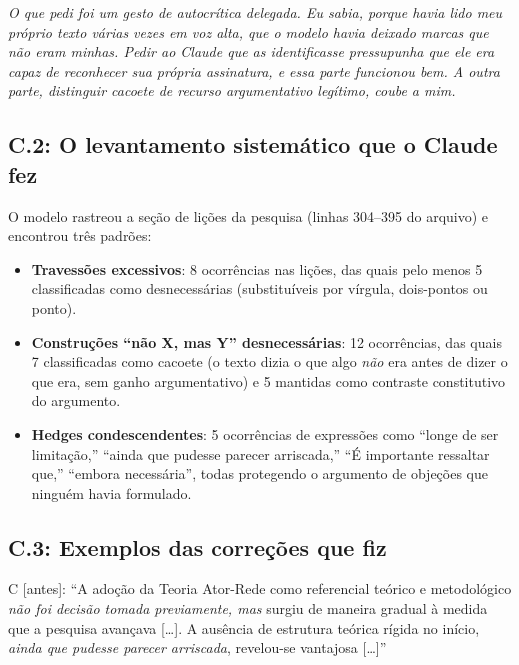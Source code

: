 \noindent\emph{O que pedi foi um gesto de autocrítica delegada. Eu sabia, porque havia lido meu próprio texto várias vezes em voz alta, que o modelo havia deixado marcas que não eram minhas. Pedir ao Claude que as identificasse pressupunha que ele era capaz de reconhecer sua própria assinatura, e essa parte funcionou bem. A outra parte, distinguir cacoete de recurso argumentativo legítimo, coube a mim.}

\bigskip

\subsection*{C.2: O levantamento sistemático que o Claude fez}

O modelo rastreou a seção de lições da pesquisa (linhas 304--395 do arquivo) e encontrou três padrões:

\begin{itemize}
\item \textbf{Travessões excessivos}: 8 ocorrências nas lições, das quais pelo menos 5 classificadas como desnecessárias (substituíveis por vírgula, dois-pontos ou ponto).

\item \textbf{Construções ``não X, mas Y'' desnecessárias}: 12 ocorrências, das quais 7 classificadas como cacoete (o texto dizia o que algo \emph{não} era antes de dizer o que era, sem ganho argumentativo) e 5 mantidas como contraste constitutivo do argumento.

\item \textbf{Hedges condescendentes}: 5 ocorrências de expressões como ``longe de ser limitação,'' ``ainda que pudesse parecer arriscada,'' ``É importante ressaltar que,'' ``embora necessária'', todas protegendo o argumento de objeções que ninguém havia formulado.
\end{itemize}

\subsection*{C.3: Exemplos das correções que fiz}

\begin{faladaC}
C [antes]: ``A adoção da Teoria Ator-Rede como referencial teórico e metodológico \emph{não foi decisão tomada previamente, mas} surgiu de maneira gradual à medida que a pesquisa avançava [\ldots]. A ausência de estrutura teórica rígida no início, \emph{ainda que pudesse parecer arriscada}, revelou-se vantajosa [\ldots]''
\end{faladaC}

